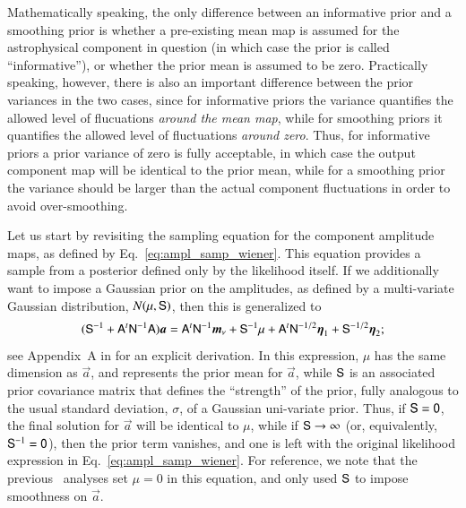 \documentclass[twocolumn]{aa}
\newcommand{\A}[0]{\tens{A}}
\renewcommand{\a}[0]{\vec{a}}
\newcommand{\m}[0]{\vec{m}}
\newcommand{\N}[0]{\tens{N}}
\renewcommand{\S}[0]{\tens{S}}
\begin{document}
Mathematically speaking, the only difference between an informative
prior and a smoothing prior is whether a pre-existing mean map is
assumed for the astrophysical component in question (in which case the
prior is called ``informative''), or whether the prior mean is assumed
to be zero. Practically speaking, however, there is also an important
difference between the prior variances in the two cases, since for
informative priors the variance quantifies the allowed level of
flucuations \emph{around the mean map}, while for smoothing priors it
quantifies the allowed level of fluctuations \emph{around zero}. Thus,
for informative priors a prior variance of zero is fully acceptable,
in which case the output component map will be identical to the prior
mean, while for a smoothing prior the variance should be larger than
the actual component fluctuations in order to avoid
over-smoothing. 

Let us start by revisiting the sampling equation for the component
amplitude maps, as defined by Eq.~\eqref{eq:ampl_samp_wiener}. This
equation provides a sample from a posterior defined only by the
likelihood itself. If we additionally want to impose a Gaussian prior
on the amplitudes, as defined by a multi-variate Gaussian
distribution, $N(\mu,\S)$, then this is generalized to 
\begin{equation}
  (\S^{-1} + \A^t\N^{-1}\A)\a = \A^t\N^{-1}\m_{\nu} + \S^{-1}\mu + \A^t\N^{-1/2}\vec{\eta}_1 +
    \S^{-1/2}\vec{\eta}_2;
  \label{eq:gauss_highdim_prior}
\end{equation}
see Appendix~A in \citet{bp01} for an explicit derivation. In this
expression, $\mu$ has the same dimension as $\a$, and represents the
prior mean for $\a$, while $\S$ is an associated prior covariance
matrix that defines the ``strength'' of the prior, fully analogous to
the usual standard deviation, $\sigma$, of a Gaussian uni-variate
prior. Thus, if $\S = \tens 0$, the final solution for $\a$ will be
identical to $\mu$, while if $\S\rightarrow\infty$ (or, equivalently,
$\S^{-1} = \tens 0$), then the prior term vanishes, and one is left with the
original likelihood expression in Eq.~\eqref{eq:ampl_samp_wiener}. For
reference, we note that the previous \Planck\ analyses
\citep{planck2016-l04,npipe} set $\mu=0$ in this equation, and only
used $\S$ to impose smoothness on $\a$.
\end{document}
